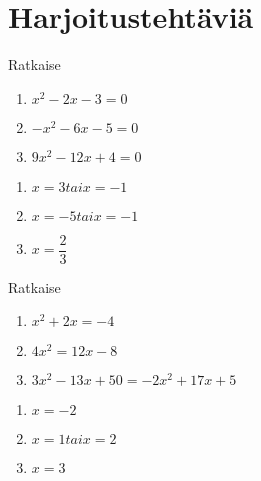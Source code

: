 \section{Harjoitustehtäviä}

\begin{tehtava}
    Ratkaise
    \begin{enumerate}
        \item $x^2 - 2x - 3 = 0$
        \item $-x^2 - 6x - 5 = 0$
        \item $9x^2 - 12x + 4 = 0$
    \end{enumerate}
    \begin{vastaus}
        \begin{enumerate}
            \item $x = 3 tai x = -1$
            \item $x = -5 tai x = -1$
            \item $x = \dfrac{2}{3}$
        \end{enumerate}
    \end{vastaus}
\end{tehtava}

\begin{tehtava}
    Ratkaise
    \begin{enumerate}
        \item $x^2 + 2x = -4$
        \item $4x^2 = 12x - 8$
        \item $3x^2 - 13x + 50 = -2x^2 + 17x + 5$
    \end{enumerate}
    \begin{vastaus}
        \begin{enumerate}
            \item $x = -2$
            \item $x = 1 tai x = 2$
            \item $x = 3$
        \end{enumerate}
    \end{vastaus}
\end{tehtava}
